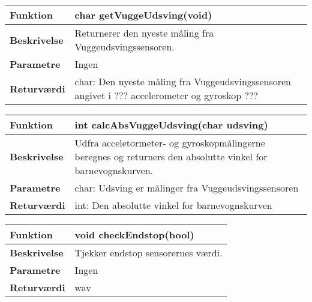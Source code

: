 \begin{center}
    \begin{tabular}{ | l | p{10cm} |}
    \hline
    \textbf{Funktion}	 	& char getVuggeUdsving(void)										\\ \hline
    \textbf{Beskrivelse} 	& Returnerer den nyeste måling fra Vuggeudsvingssensoren.		\\ \hline
    \textbf{Parametre}		& Ingen			 										\\ \hline
    \textbf{Returværdi} 	& char: Den nyeste måling fra Vuggeudsvingssensoren angivet i ??? accelerometer og gyroskop ???		 											\\ \hline
    \end{tabular}
\end{center}

\begin{center}
    \begin{tabular}{ | l | p{10cm} |}
    \hline
    \textbf{Funktion}	 	& int calcAbsVuggeUdsving(char udsving)										\\ \hline
    \textbf{Beskrivelse} 	& Udfra acceletormeter- og gyroskopmålingerne beregnes og returners den absolutte vinkel for barnevognskurven. 		\\ \hline
    \textbf{Parametre}		& char: Udsving er målinger fra Vuggeudsvingssensoren 		\\ \hline
    \textbf{Returværdi} 	& int: Den absolutte vinkel for barnevognskurven			\\ \hline
    \end{tabular}
\end{center}



\begin{center}
    \begin{tabular}{ | l | p{10cm} |}
    \hline
    \textbf{Funktion}	 	& void checkEndstop(bool)										\\ \hline
    \textbf{Beskrivelse} 	& Tjekker endstop sensorernes værdi.		\\ \hline
    \textbf{Parametre}		& Ingen			 										\\ \hline
    \textbf{Returværdi} 	& wav		 											\\ \hline
    \end{tabular}
\end{center}

